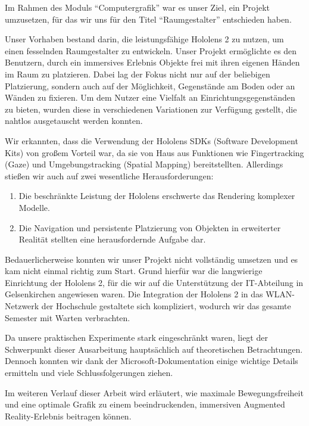 Im Rahmen des Moduls \enquote{Computergrafik} war es unser Ziel, ein Projekt umzusetzen, für das wir uns für den Titel \enquote{Raumgestalter} entschieden haben.

Unser Vorhaben bestand darin, die leistungsfähige Hololens 2 zu nutzen, um einen fesselnden Raumgestalter zu entwickeln.
Unser Projekt ermöglichte es den Benutzern, durch ein immersives Erlebnis Objekte frei mit ihren eigenen Händen im Raum zu platzieren.
Dabei lag der Fokus nicht nur auf der beliebigen Platzierung, sondern auch auf der Möglichkeit, Gegenstände am Boden oder an Wänden zu fixieren.
Um dem Nutzer eine Vielfalt an Einrichtungsgegenständen zu bieten, wurden diese in verschiedenen Variationen zur Verfügung gestellt, die nahtlos ausgetauscht werden konnten.

Wir erkannten, dass die Verwendung der Hololens SDKs (Software Development Kits) von großem Vorteil war, da sie von Haus aus Funktionen wie Fingertracking (Gaze) und Umgebungstracking (Spatial Mapping) bereitstellten.
Allerdings stießen wir auch auf zwei wesentliche Herausforderungen:

\begin{enumerate}
    \item Die beschränkte Leistung der Hololens erschwerte das Rendering komplexer Modelle.
    \item Die Navigation und persistente Platzierung von Objekten in erweiterter Realität stellten eine herausfordernde Aufgabe dar.
\end{enumerate}

Bedauerlicherweise konnten wir unser Projekt nicht vollständig umsetzen und es kam nicht einmal richtig zum Start.
Grund hierfür war die langwierige Einrichtung der Hololens 2, für die wir auf die Unterstützung der IT-Abteilung in Gelsenkirchen angewiesen waren.
Die Integration der Hololens 2 in das WLAN-Netzwerk der Hochschule gestaltete sich kompliziert, wodurch wir das gesamte Semester mit Warten verbrachten.

Da unsere praktischen Experimente stark eingeschränkt waren, liegt der Schwerpunkt dieser Ausarbeitung hauptsächlich auf theoretischen Betrachtungen.
Dennoch konnten wir dank der Microsoft-Dokumentation einige wichtige Details ermitteln und viele Schlussfolgerungen ziehen.

Im weiteren Verlauf dieser Arbeit wird erläutert, wie maximale Bewegungsfreiheit und eine optimale Grafik zu einem beeindruckenden, immersiven Augmented Reality-Erlebnis beitragen können.
